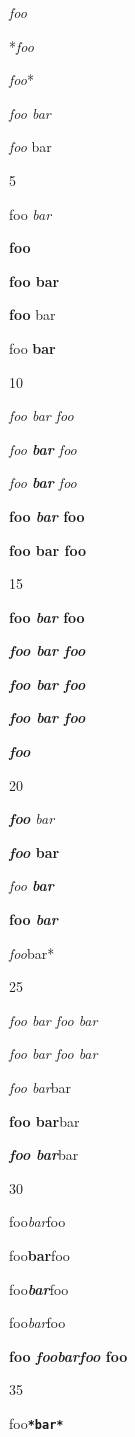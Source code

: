 \emph{foo}

*\emph{foo}

\emph{foo}*

\emph{foo bar}

\emph{foo} bar

5

foo \emph{bar}

\textbf{foo}

\textbf{foo bar}

\textbf{foo} bar

foo \textbf{bar}

10

\emph{foo \emph{bar} foo}

\emph{foo \textbf{bar} foo}

\emph{foo \textbf{\emph{bar}} foo}

\textbf{foo \emph{bar} foo}

\textbf{foo \textbf{bar} foo}

15

\textbf{foo \textbf{\emph{bar}} foo}

\textbf{\emph{foo \emph{bar} foo}}

\textbf{\emph{foo \textbf{bar} foo}}

\textbf{\emph{foo \textbf{\emph{bar}} foo}}

\textbf{\emph{foo}}

20

\emph{\textbf{foo} bar}

\textbf{\emph{foo} bar}

\emph{foo \textbf{bar}}

\textbf{foo \emph{bar}}

\emph{foo}bar*

25

\emph{foo \emph{bar \emph{foo \emph{bar}}}}

\emph{\emph{\emph{\emph{foo} bar} foo} bar}

\emph{foo bar}bar

\textbf{foo bar}bar

\textbf{\emph{foo bar}}bar

30

foo\emph{bar}foo

foo\textbf{bar}foo

foo\textbf{\emph{bar}}foo

foo\emph{bar}foo

\textbf{foo \emph{foobarfoo} foo}

35

foo\textbf{\texttt{*bar*}}

